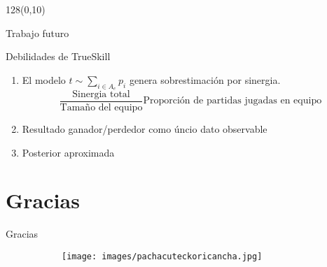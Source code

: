 \documentclass[shownotes]{beamer}
\begin{document}
\begin{frame}
 \begin{textblock}{128}(0,10)
\begin{center}
 \large Trabajo futuro
\end{center}
\end{textblock}
\vspace{1cm}


  {\normalsize Debilidades de TrueSkill}
 

 \begin{enumerate}
 
  \item El modelo $t \sim \sum_{i \in A_e} p_i$ genera sobrestimaci\'on por sinergia.
  \begin{equation}
   \frac{\text{Sinergia total}}{\text{Tamaño del equipo}} \text{Proporci\'on de partidas jugadas en equipo}
  \end{equation}

  \item Resultado ganador/perdedor como \'uncio dato observable
  
  \item Posterior aproximada
  
 \end{enumerate}
 
\end{frame}

\section{Gracias}

\begin{frame}
 
 \begin{center}
  \Large Gracias
 \end{center}

 \begin{figure}[H]     
     \centering
     \begin{subfigure}[b]{0.45\textwidth}
       \texttt{[image: images/pachacuteckoricancha.jpg]} 
     \end{subfigure}
   \end{figure} 
  
\end{frame}
\end{document}
